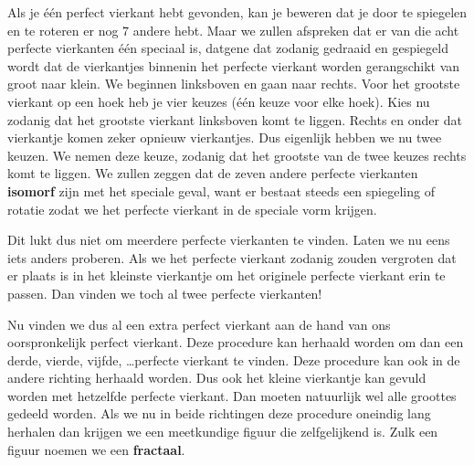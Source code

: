 \clearpage

Als je \'e\'en perfect vierkant hebt gevonden, kan je beweren dat je door te spiegelen en te roteren er nog $7$ andere hebt. Maar we zullen afspreken dat er van die acht perfecte vierkanten \'e\'en speciaal is, datgene dat zodanig gedraaid en gespiegeld wordt dat de vierkantjes binnenin het perfecte vierkant worden gerangschikt van groot naar klein. We beginnen linksboven en gaan naar rechts. Voor het grootste vierkant op een hoek heb je vier keuzes (\'e\'en keuze voor elke hoek). Kies nu zodanig dat het grootste vierkant linksboven komt te liggen. Rechts en onder dat vierkantje komen zeker opnieuw vierkantjes. Dus eigenlijk hebben we nu twee keuzen. We nemen deze keuze, zodanig dat het grootste van de twee keuzes rechts komt te liggen. We zullen zeggen dat de zeven andere perfecte vierkanten {\bf isomorf} zijn met het speciale geval, want er bestaat steeds een spiegeling of rotatie zodat we het perfecte vierkant in de speciale vorm krijgen.



\begin{center}
  
\end{center}

Dit lukt dus niet om meerdere perfecte vierkanten te vinden. Laten we nu eens iets anders proberen. Als we het perfecte vierkant zodanig zouden vergroten dat er plaats is in het kleinste vierkantje om het originele perfecte vierkant erin te passen. Dan vinden we toch al twee perfecte vierkanten!



Nu vinden we dus al een extra perfect vierkant aan de hand van ons oorspronkelijk perfect vierkant. Deze procedure kan herhaald worden om dan een derde, vierde, vijfde, \ldots perfecte vierkant te vinden. Deze procedure kan ook in de andere richting herhaald worden. Dus ook het kleine vierkantje kan gevuld worden met hetzelfde perfecte vierkant. Dan moeten natuurlijk wel alle groottes gedeeld worden. Als we nu in beide richtingen deze procedure oneindig lang herhalen dan krijgen we een meetkundige figuur die zelfgelijkend is. Zulk een figuur noemen we een {\bf fractaal}.

